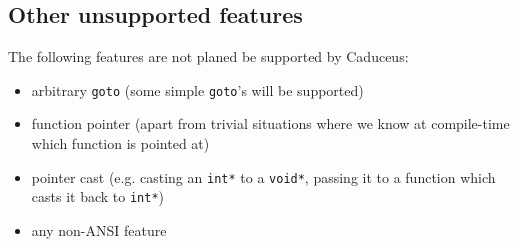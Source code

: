 \documentclass[12pt,a4paper,twoside,openright]{report}
\newcommand{\caduceus}{\textsf{Caduceus}}
\begin{document}
\subsection{Other unsupported features}
The following features are not planed be supported by \caduceus:
\begin{itemize}
\item arbitrary \texttt{goto} (some simple \texttt{goto}'s will be supported)
\item function pointer (apart from trivial situations where we know at
  compile-time which function is pointed at)
\item pointer cast (e.g. casting an \texttt{int*} to a \texttt{void*},
  passing it to a function which casts it back to \texttt{int*})
\item any non-ANSI feature
\end{itemize}



\nocite{*}




\tableofcontents

{}
\printindex
\end{document}

